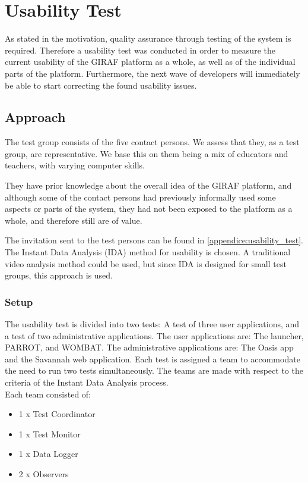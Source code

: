 \section{Usability Test}
\label{common:sec:usability_test}
As stated in the motivation, quality assurance through testing of the system is required. Therefore a usability test was conducted in order to measure the current usability of the GIRAF platform as a whole, as well as of the individual parts of the platform. Furthermore, the next wave of developers will immediately be able to start correcting the found usability issues.

\subsection{Approach}
The test group consists of the five contact persons. We assess that they, as a test group, are representative. We base this on them being a mix of educators and teachers, with varying computer skills.

They have prior knowledge about the overall idea of the GIRAF platform, and although some of the contact persons had previously informally used some aspects or parts of the system, they had not been exposed to the platform as a whole, and therefore still are of value.

The invitation sent to the test persons can be found in \ref{appendice:usability_test}.\\

The Instant Data Analysis (IDA) method for usability is chosen. A traditional video analysis method could be used, but since IDA is designed for small test groups, this approach is used. \cite{usability:ida}

\subsubsection*{Setup}
The usability test is divided into two tests: A test of three user applications, and a test of two administrative applications. 
The user applications are: The launcher, PARROT, and WOMBAT. The administrative applications are: The Oasis app and the Savannah web application.
Each test is assigned a team to accommodate the need to run two tests simultaneously.
The teams are made with respect to the criteria of the Instant Data Analysis process.\\
Each team consisted of:

\begin{itemize}
	\item 1 x Test Coordinator
	\item 1 x Test Monitor
	\item 1 x Data Logger
	\item 2 x Observers
\end{itemize}

